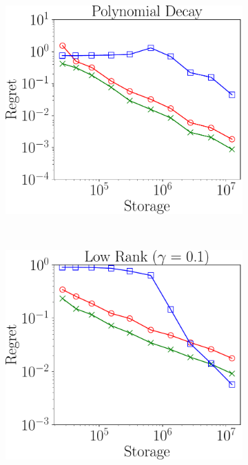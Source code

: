 \begin{figure}
	\begin{subfigure}{0.3\textwidth}
		\includegraphics[scale = 0.24]{figure/fig1_spd.pdf}
	\end{subfigure}\\
	\begin{subfigure}{0.3\textwidth}
		\includegraphics[scale = 0.24]{figure/fig1_lk_mnoise.pdf}
	\end{subfigure}
	\begin{subfigure}{0.43\textwidth}

\end{subfigure}
\end{figure}
